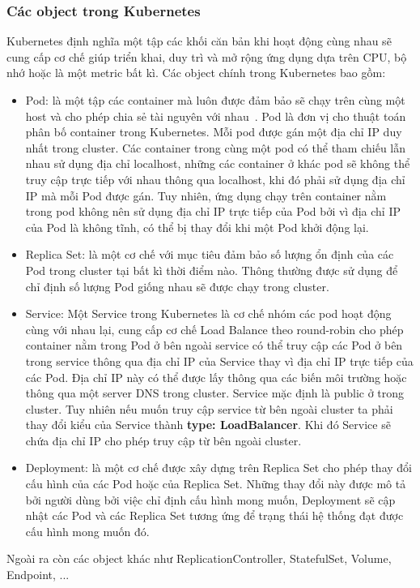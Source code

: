 \subsubsection{Các object trong Kubernetes}
Kubernetes định nghĩa một tập các khối căn bản khi hoạt động cùng
nhau sẽ cung cấp cơ chế giúp triển khai, duy trì và mở rộng ứng
dụng dựa trên CPU, bộ nhớ hoặc là một metric bất kì.
Các object chính trong Kubernetes bao gồm:
\begin{itemize}[topsep=0ex]
\item Pod: là một tập các container mà luôn được đảm bảo sẽ chạy
trên cùng một host và cho phép chia sẻ tài
nguyên với nhau~\cite{kubernetes-book}.
Pod là đơn vị cho thuật toán phân bố container trong Kubernetes.
Mỗi pod được gán một địa chỉ IP duy nhất trong cluster. Các
container trong cùng một pod có thể tham chiếu lẫn nhau sử dụng
địa chỉ localhost, những các container ở khác pod sẽ không thể
truy cập trực tiếp với nhau thông qua localhost, khi đó phải
sử dụng địa chỉ IP mà mỗi Pod được gán. Tuy nhiên, ứng dụng
chạy trên container nằm trong pod không nên sử dụng địa
chỉ IP trực tiếp của Pod bởi vì địa chỉ IP của Pod là không tĩnh,
có thể bị thay đổi khi một Pod khởi động lại.

\item Replica Set: là một cơ chế với mục tiêu đảm bảo số lượng ổn
định của các Pod trong cluster tại bất kì thời điểm nào.
Thông thường được sử dụng để chỉ định số lượng Pod giống nhau
sẽ được chạy trong cluster.

\item Service: Một Service trong Kubernetes là cơ chế nhóm các pod
hoạt động cùng với nhau lại, cung cấp cơ chế Load Balance theo
round-robin cho phép container nằm trong Pod ở bên ngoài service
có thể truy cập các Pod ở bên trong service thông qua địa
chỉ IP của Service thay vì địa chỉ IP trực tiếp của các Pod.
Địa chỉ IP này có thể được lấy thông qua các biến môi trường hoặc
thông qua một server DNS trong cluster. Service mặc định là
public ở trong cluster. Tuy nhiên nếu muốn truy cập service từ
bên ngoài cluster ta phải thay đổi kiểu của Service thành 
\textbf{type: LoadBalancer}.
Khi đó Service sẽ chứa địa chỉ IP cho phép truy
cập từ bên ngoài cluster.

\item Deployment: là một cơ chế được xây dựng trên Replica Set
cho phép thay đổi cấu hình của các Pod hoặc của Replica Set.
Những thay đổi này được mô tả bởi người dùng bởi việc chỉ định
cấu hình mong muốn, Deployment sẽ cập nhật các Pod và các Replica
Set tương ứng để trạng thái hệ thống đạt được cấu hình mong muốn đó. 
\end{itemize}
Ngoài ra còn các object khác như ReplicationController,
StatefulSet, Volume, Endpoint, ...
